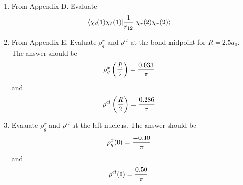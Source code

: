 \begin{enumerate}
\item From Appendix D. Evaluate
\begin{equation}
\langle \chi_\ell(1) \chi_\ell(1) \vert {1 \over r_{12}} \vert 
\chi_r(2) \chi_r(2) \rangle
\end{equation}

\item From Appendix E. Evaluate $\rho^x_g$ and $\rho^{cl}$ 
at the bond midpoint for $R = 2.5a_0$. The answer should be
\begin{equation}
\rho^x_g \left( {R \over 2} \right) = {0.033 \over \pi}
\end{equation}
and
\begin{equation}
\rho^{cl} \left( {R \over 2} \right) = {0.286 \over \pi}
\end{equation}

\item Evaluate $\rho^x_g$ and $\rho^{cl}$ at the left nucleus. The 
answer should be
\begin{equation}
\rho^x_g (0) = {-0.10 \over \pi}
\end{equation}
and 
\begin{equation}
\rho^{cl} (0) = {0.50 \over \pi}.
\end{equation}
\end{enumerate}

